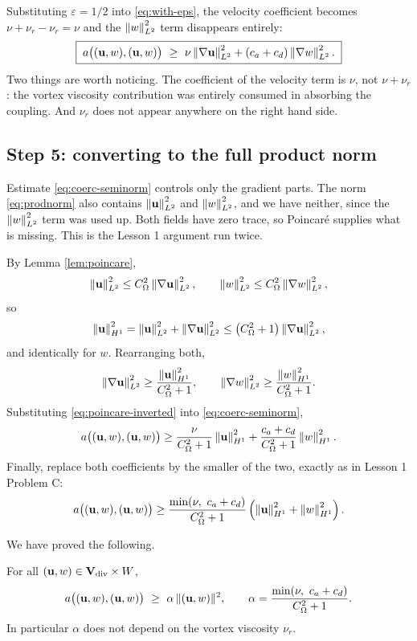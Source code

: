 \documentclass[11pt,a4paper]{article}
\begin{document}
Substituting $\varepsilon = 1/2$ into \eqref{eq:with-eps}, the velocity
coefficient becomes $\nu + \nu_{r} - \nu_{r} = \nu$ and the $\left\lVert w \right\rVert_{L^{2}}^{2}$ term
disappears entirely:
\begin{equation}\label{eq:coerc-seminorm}
  \boxed{\;
  a\big( (\mathbf{u},w),(\mathbf{u},w) \big)
  \ \ge\ \nu \left\lVert \nabla \mathbf{u} \right\rVert_{L^{2}}^{2} + (c_{a}+c_{d})\left\lVert \nabla w \right\rVert_{L^{2}}^{2} .
  \;}
\end{equation}
Two things are worth noticing. The coefficient of the velocity term is $\nu$,
not $\nu + \nu_{r}$: the vortex viscosity contribution was entirely consumed in
absorbing the coupling. And $\nu_{r}$ does not appear anywhere on the right hand
side.

\subsection{Step 5: converting to the full product norm}

Estimate \eqref{eq:coerc-seminorm} controls only the gradient parts. The norm
\eqref{eq:prodnorm} also contains $\left\lVert \mathbf{u} \right\rVert_{L^{2}}^{2}$ and $\left\lVert w \right\rVert_{L^{2}}^{2}$, and we
have neither, since the $\left\lVert w \right\rVert_{L^{2}}^{2}$ term was used up. Both fields have zero
trace, so Poincar\'e supplies what is missing. This is the Lesson 1 argument run
twice.

By Lemma \ref{lem:poincare},
\[
  \left\lVert \mathbf{u} \right\rVert_{L^{2}}^{2} \le C_\Omega^{2} \left\lVert \nabla \mathbf{u} \right\rVert_{L^{2}}^{2},
  \qquad
  \left\lVert w \right\rVert_{L^{2}}^{2} \le C_\Omega^{2} \left\lVert \nabla w \right\rVert_{L^{2}}^{2},
\]
so
\[
  \left\lVert \mathbf{u} \right\rVert_{H^{1}}^{2} = \left\lVert \mathbf{u} \right\rVert_{L^{2}}^{2} + \left\lVert \nabla \mathbf{u} \right\rVert_{L^{2}}^{2}
  \le \left( C_\Omega^{2} + 1 \right) \left\lVert \nabla \mathbf{u} \right\rVert_{L^{2}}^{2} ,
\]
and identically for $w$. Rearranging both,
\begin{equation}\label{eq:poincare-inverted}
  \left\lVert \nabla \mathbf{u} \right\rVert_{L^{2}}^{2} \ge \frac{\left\lVert \mathbf{u} \right\rVert_{H^{1}}^{2}}{C_\Omega^{2}+1},
  \qquad
  \left\lVert \nabla w \right\rVert_{L^{2}}^{2} \ge \frac{\left\lVert w \right\rVert_{H^{1}}^{2}}{C_\Omega^{2}+1} .
\end{equation}
Substituting \eqref{eq:poincare-inverted} into \eqref{eq:coerc-seminorm},
\[
  a\big( (\mathbf{u},w),(\mathbf{u},w) \big)
  \ge \frac{\nu}{C_\Omega^{2}+1}\left\lVert \mathbf{u} \right\rVert_{H^{1}}^{2}
  + \frac{c_{a}+c_{d}}{C_\Omega^{2}+1}\left\lVert w \right\rVert_{H^{1}}^{2} .
\]
Finally, replace both coefficients by the smaller of the two, exactly as in
Lesson 1 Problem C:
\[
  a\big( (\mathbf{u},w),(\mathbf{u},w) \big)
  \ge \frac{\min(\nu,\ c_{a}+c_{d})}{C_\Omega^{2}+1}
  \left( \left\lVert \mathbf{u} \right\rVert_{H^{1}}^{2} + \left\lVert w \right\rVert_{H^{1}}^{2} \right) .
\]

We have proved the following.

\begin{theorem}[Coercivity]\label{thm:coercivity}
For all $(\mathbf{u},w) \in \mathbf{V}_{\mathrm{div}} \times W$,
\[
  a\big( (\mathbf{u},w),(\mathbf{u},w) \big)
  \ \ge\ \alpha \, \lVert (\mathbf{u},w) \rVert^{2} ,
  \qquad
  \alpha = \frac{\min(\nu,\ c_{a}+c_{d})}{C_\Omega^{2}+1} .
\]
In particular $\alpha$ does not depend on the vortex viscosity $\nu_{r}$.
\end{theorem}
\end{document}
